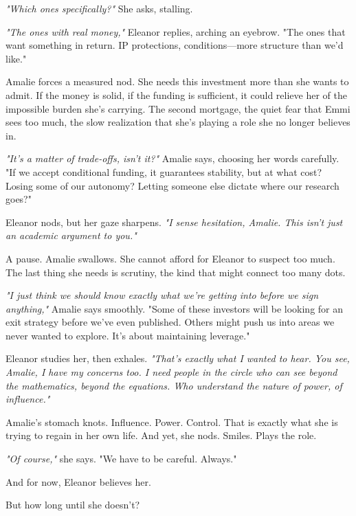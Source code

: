\textit{"Which ones specifically?"} She asks, stalling.

\textit{"The ones with real money,"} Eleanor replies, arching an eyebrow. "The ones that want something in return. IP protections, conditions—more structure than we’d like." 

Amalie forces a measured nod. She needs this investment more than she wants to admit. If the money is solid, if the funding is sufficient, it could relieve her of the impossible burden she’s carrying. The second mortgage, the quiet fear that Emmi sees too much, the slow realization that she’s playing a role she no longer believes in. 

\textit{"It’s a matter of trade-offs, isn’t it?"} Amalie says, choosing her words carefully. "If we accept conditional funding, it guarantees stability, but at what cost? Losing some of our autonomy? Letting someone else dictate where our research goes?" 

Eleanor nods, but her gaze sharpens. \textit{"I sense hesitation, Amalie. This isn’t just an academic argument to you."} 

A pause. Amalie swallows. She cannot afford for Eleanor to suspect too much. The last thing she needs is scrutiny, the kind that might connect too many dots. 

\textit{"I just think we should know exactly what we’re getting into before we sign anything,"} Amalie says smoothly. "Some of these investors will be looking for an exit strategy before we’ve even published. Others might push us into areas we never wanted to explore. It’s about maintaining leverage." 

Eleanor studies her, then exhales. \textit{"That’s exactly what I wanted to hear. You see, Amalie, I have my concerns too. I need people in the circle who can see beyond the mathematics, beyond the equations. Who understand the nature of power, of influence."} 

Amalie’s stomach knots. Influence. Power. Control. That is exactly what she is trying to regain in her own life. And yet, she nods. Smiles. Plays the role. 

\textit{"Of course,"} she says. "We have to be careful. Always."

And for now, Eleanor believes her. 

But how long until she doesn’t?
